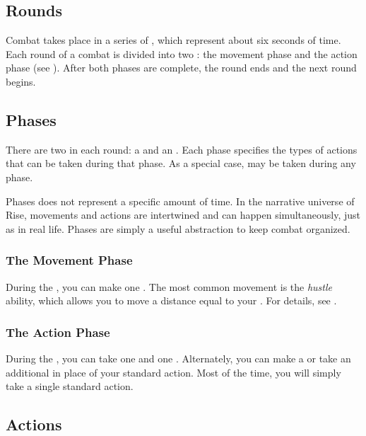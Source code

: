   \subsection{Rounds}\label{Rounds}

    Combat takes place in a series of , which represent about six seconds of time.
    Each round of a combat is divided into two : the movement phase and the action phase (see ).
    After both phases are complete, the round ends and the next round begins.

  \subsection{Phases}\label{Phases}

    There are two  in each round: a  and an .
    Each phase specifies the types of actions that can be taken during that phase.
    As a special case,  may be taken during any phase.

    Phases does not represent a specific amount of time.
    In the narrative universe of Rise, movements and actions are intertwined and can happen simultaneously, just as in real life.
    Phases are simply a useful abstraction to keep combat organized.

    \subsubsection{The Movement Phase}\label{The Movement Phase}
      During the , you can make one .
      The most common movement is the \textit{hustle} ability, which allows you to move a distance equal to your .
      For details, see .

    \subsubsection{The Action Phase}\label{The Action Phase}
      During the , you can take one  and one .
      Alternately, you can make a  or take an additional  in place of your standard action.
      Most of the time, you will simply take a single standard action.

  \subsection{Actions}\label{Actions}

